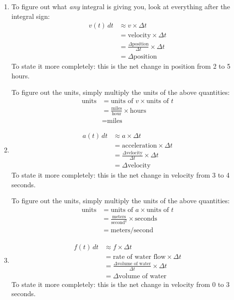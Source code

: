 \documentclass[oneside]{book}
\theoremstyle{definition}
\theoremstyle{solution}
\newtheorem*{solution}{Solution}
\newenvironment{solution}{\vspace{2in}\comment}{\endcomment}
\begin{document}
\begin{solution}
  \begin{enumerate}
  \item To figure out what \emph{any} integral is giving you, look at
    everything after the integral sign:
    \begin{align*}
      v(t) \,dt & \approx v\times \Delta t\\
                & = \text{velocity} \times \Delta t\\
                & = \frac{\Delta \text{position}}{\Delta t} \times \Delta t\\
                & = \Delta \text{position}
    \end{align*}
    To state it more completely: this is the net change in position from 2 to 5 hours.  
          
    To figure out the units, simply multiply the units of the above quantities:
    \begin{align*}
      \text{units} & = \text{units of }v \times \text{units of }t\\
                   & = \frac{\text{miles}}{\text{hour}}\times \text{hours}\\
                   & = \text{miles}
    \end{align*}
          
  \item 
    \begin{align*}
      a(t) \,dt & \approx a\times \Delta t\\
                & = \text{acceleration} \times \Delta t\\
                & = \frac{\Delta \text{velocity}}{\Delta t} \times \Delta t\\
                & = \Delta \text{velocity}
    \end{align*}
    To state it more completely: this is the net change in velocity from 3 to 4 seconds.  
          
    To figure out the units, simply multiply the units of the above quantities:
    \begin{align*}
      \text{units} & = \text{units of }a \times \text{units of }t\\
                   & = \frac{\text{meters}}{\text{second}^2}\times \text{seconds}\\
                   & = \text{meters}/\text{second}
    \end{align*}

  \item 
    \begin{align*}
      f(t) \,dt & \approx f \times \Delta t\\
                & = \text{rate of water flow} \times \Delta t\\
                & = \frac{\Delta \text{volume of water}}{\Delta t} \times \Delta t\\
                & = \Delta \text{volume of water}
    \end{align*}
    To state it more completely: this is the net change in velocity from 0 to 3 seconds.  
          

\end{enumerate}
\end{solution}
\end{document}
